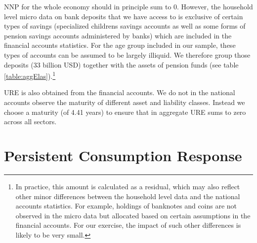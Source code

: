 \documentclass[titlepage]{\econtex}\newcommand{\texname}{ConsumptionHeterogeneity}
\begin{document}
NNP for the whole economy should in principle sum to 0. However, the household level micro data on bank deposits that we have access to is exclusive of certain types of savings (specialized childrens savings accounts as well as some forms of pension savings accounts administered by banks) which are included in the financial accounts statistics. For the age group included in our sample, these types of accounts can be assumed to be largely illiquid. We therefore group those deposits (33 billion USD) together with the assets of pension funds (see table \ref{table:aggElas}).\footnote{In practice, this amount is calculated as a residual, which may also reflect other minor differences between the household level data and the national accounts statistics. For example, holdings of banknotes and coins are not observed in the micro data but allocated based on certain assumptions in the financial accounts. For our exercise, the impact of such other differences is likely to be very small.}

URE is also obtained from the financial accounts. We do not in the national accounts observe the maturity of different asset and liability classes. Instead we choose a maturity (of 4.41 years) to ensure that in aggregate URE sums to zero across all sectors.

\section{Persistent Consumption Response} \label{consumption_persistence_appendix}
\setcounter{figure}{0}   
\setcounter{table}{0} 
\end{document}
